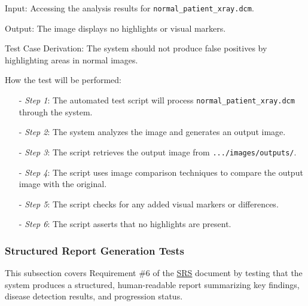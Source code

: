 \documentclass[12pt, titlepage]{article}
\begin{document}
\begin{enumerate}
Input: Accessing the analysis results for \texttt{normal\_patient\_xray.dcm}.

Output: The image displays no highlights or visual markers.

Test Case Derivation: The system should not produce false positives by highlighting areas in normal images.

How the test will be performed:
\begin{itemize}
\item[-] \textit{Step 1}: The automated test script will process \texttt{normal\_patient\_xray.dcm} through the system.
\item[-] \textit{Step 2}: The system analyzes the image and generates an output image.
\item[-] \textit{Step 3}: The script retrieves the output image from \texttt{.../images/outputs/}.
\item[-] \textit{Step 4}: The script uses image comparison techniques to compare the output image with the original.
\item[-] \textit{Step 5}: The script checks for any added visual markers or differences.
\item[-] \textit{Step 6}: The script asserts that no highlights are present.
\end{itemize}
\end{enumerate}

\subsubsection{Structured Report Generation Tests}

This subsection covers Requirement \#6 of the \href{https://github.com/RezaJodeiri/CXR-Capstone/blob/main/docs/SRS/SRS.pdf}{SRS} \citep{SRS}
document by testing that the system produces a structured, human-readable report summarizing key findings, disease detection results, and progression status.
\end{document}
